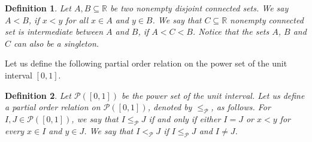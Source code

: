 \documentclass[pdflatex,sn-mathphys-num]{sn-jnl}
\theoremstyle{thmstyleone}%
\theoremstyle{thmstyletwo}%
\theoremstyle{thmstylethree}%
\newtheorem{defi}{Definition}%
\begin{document}
\begin{defi}\label{def_interm}
Let $A,B\subseteq\mathbb{R}$ be two nonempty disjoint connected sets. 
We say $A<B$, if $x<y$ for all $x\in A$ and $y\in B$. 
We say that $C\subseteq \mathbb{R}$ nonempty connected set is \emph{intermediate} between $A$ and $B$, if $A<C<B$.
Notice that the sets $A$, $B$ and $C$ can also be a singleton.
\end{defi}

\noindent Let us define the following partial order relation on the power set of the unit interval $[0,1]$. 

\begin{defi}\label{def_order_power}
    Let $\mathcal{P}([0,1])$ be the power set of the unit interval. 
    Let us define a partial order relation on $\mathcal{P}([0,1])$, denoted by $\le_{\mathcal{P}}$, as follows.
    For $I,J\in \mathcal{P}([0,1])$, we say that $I\leq_{\mathcal{P}} J$ if and only if either $I=J$ or $x<y$ for every $x\in I$ and $y\in J$. We say that $I <_\mathcal{P} J$ if $I\le_\mathcal{P} J$ and $I\neq J$.
\end{defi}
\end{document}
